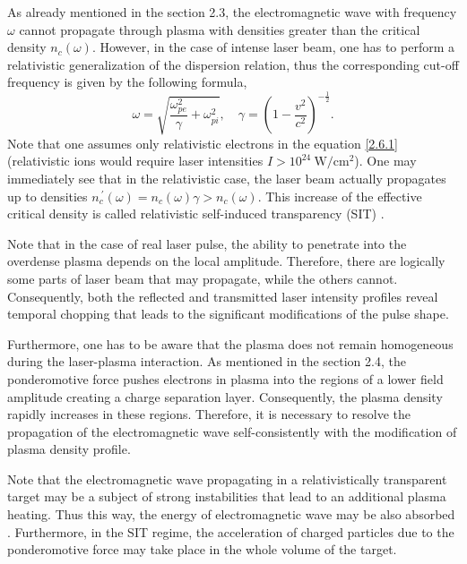 As already mentioned in the section 2.3, the electromagnetic wave with frequency $ \omega $ cannot propagate through plasma with densities greater than the critical density $ n_c \left( \omega \right) $. However, in the case of intense laser beam, one has to perform a relativistic generalization of the dispersion relation, thus the corresponding cut-off frequency is given by the following formula,
\begin{equation}
\label{2.6.1}
\omega = \sqrt{\frac{\omega_{pe}^2}{\gamma} + \omega_{pi}^2}, \quad \gamma = \left( 1 - \frac{v^{2}}{c^2} \right)^{-\frac{1}{2}}.
\end{equation}
Note that one assumes only relativistic electrons in the equation \ref{2.6.1} (relativistic ions would require laser intensities $ I > 10^{24} \ \mathrm{W/cm^2} $). One may immediately see that in the relativistic case, the laser beam actually propagates up to densities $ n_c^{\: \prime} \left( \omega \right) = n_c \left( \omega \right) \gamma > n_c \left( \omega \right) $. This increase of the effective critical density is called relativistic self-induced transparency (SIT) \cite{Fuchs1998, Macchi2013}.

Note that in the case of real laser pulse, the ability to penetrate into the overdense plasma depends on the local amplitude. Therefore, there are logically some parts of laser beam that may propagate, while the others cannot. Consequently, both the reflected and transmitted laser intensity profiles reveal temporal chopping that leads to the significant modifications of the pulse shape.

Furthermore, one has to be aware that the plasma does not remain homogeneous during the laser-plasma interaction. As mentioned in the section 2.4, the ponderomotive force pushes electrons in plasma into the regions of a lower field amplitude creating a charge separation layer. Consequently, the plasma density rapidly increases in these regions. Therefore, it is necessary to resolve the propagation of the electromagnetic wave self-consistently with the modification of plasma density profile.

Note that the electromagnetic wave propagating in a relativistically transparent target may be a subject of strong instabilities that lead to an additional plasma heating. Thus this way, the energy of electromagnetic wave may be also absorbed \cite{Macchi2013}. Furthermore, in the SIT regime, the acceleration of charged particles due to the ponderomotive force may take place in the whole volume of the target.

